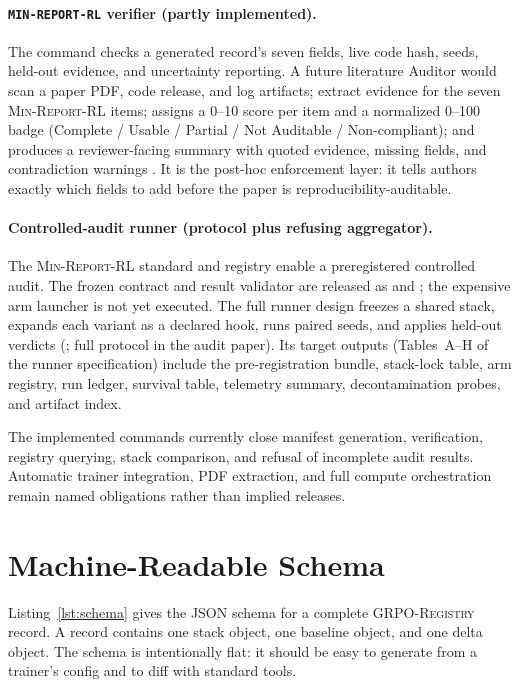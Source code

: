 \documentclass[11pt]{article}
\newcommand{\minreport}{\textsc{Min-Report-RL}}
\newcommand{\grpoReg}{\textsc{GRPO-Registry}}
\begin{document}
\paragraph{\texttt{MIN-REPORT-RL} verifier (partly implemented).} The
 command checks a generated
record's seven fields, live code hash, seeds, held-out evidence, and uncertainty
reporting. A future literature Auditor would scan a paper PDF, code release,
and log artifacts; extract evidence
for the seven \minreport{} items; assigns a 0--10 score per item and a
normalized 0--100 badge (Complete / Usable / Partial / Not Auditable /
Non-compliant); and produces a reviewer-facing summary with quoted evidence,
missing fields, and contradiction warnings \cite{zvfaudit2026}. It is the
post-hoc enforcement layer: it tells authors exactly which fields to add before
the paper is reproducibility-auditable.

\paragraph{Controlled-audit runner (protocol plus refusing aggregator).} The
\minreport{} standard and registry enable a preregistered controlled audit.
The frozen contract and result validator are released as
 and
; the expensive arm launcher is not
yet executed. The full runner design freezes a shared stack, expands each
variant as a declared hook, runs paired seeds, and applies held-out verdicts
(\cite{zvfaudit2026}; full protocol in the audit paper). Its target outputs
(Tables~A--H of the runner specification) include the pre-registration bundle,
stack-lock table, arm registry, run ledger, survival table, telemetry summary,
decontamination probes, and artifact index.

The implemented commands currently close manifest generation, verification,
registry querying, stack comparison, and refusal of incomplete audit results.
Automatic trainer integration, PDF extraction, and full compute orchestration
remain named obligations rather than implied releases.

\section{Machine-Readable Schema}
\label{sec:json}


Listing~\ref{lst:schema} gives the JSON schema for a complete \grpoReg{}
record. A record contains one stack object, one baseline object, and one delta
object. The schema is intentionally flat: it should be easy to generate from a
trainer's config and to diff with standard tools.
\end{document}
